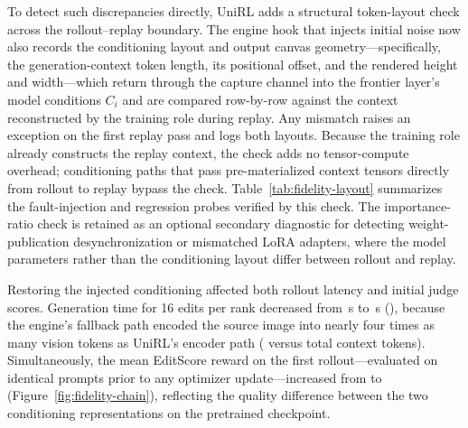 To detect such discrepancies directly, UniRL adds a structural token-layout check across the rollout--replay boundary.
The engine hook that injects initial noise now also records the conditioning layout and output canvas geometry---specifically, the generation-context token length, its positional offset, and the rendered height and width---which return through the capture channel into the frontier layer's model conditions $C_i$ and are compared row-by-row against the context reconstructed by the training role during replay.
Any mismatch raises an exception on the first replay pass and logs both layouts.
Because the training role already constructs the replay context, the check adds no tensor-compute overhead; conditioning paths that pass pre-materialized context tensors directly from rollout to replay bypass the check.
Table~\ref{tab:fidelity-layout} summarizes the fault-injection and regression probes verified by this check.
The importance-ratio check is retained as an optional secondary diagnostic for detecting weight-publication desynchronization or mismatched LoRA adapters, where the model parameters rather than the conditioning layout differ between rollout and replay.

\begin{table}[H]
\caption{Validation probes for the structural token-layout check across text-to-image (\texttt{t2i}) and image-to-image editing (\texttt{it2i}) paths. ``Engine'' and ``Trainer'' columns report the generation-context token counts on each side. The final column reports the maximum first-update importance-ratio deviation $|\rho-1|$ in the same run.}
\label{tab:fidelity-layout}
\centering
\small

\end{table}

Restoring the injected conditioning affected both rollout latency and initial judge scores.
Generation time for 16 edits per rank decreased from \RFMainGenerate{}\,s to \RFFixGenerate{}\,s (\RFFixSaving{}), because the engine's fallback path encoded the source image into nearly four times as many vision tokens as UniRL's encoder path (\RFWorkerKv{} versus \RFTrainerKv{} total context tokens).
Simultaneously, the mean EditScore reward on the first rollout---evaluated on identical prompts prior to any optimizer update---increased from \RFMainReward{} to \RFFixReward{} (Figure~\ref{fig:fidelity-chain}), reflecting the quality difference between the two conditioning representations on the pretrained checkpoint.

